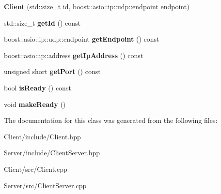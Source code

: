 \begin{DoxyCompactItemize}
\item 
{\bfseries Client} (std\+::size\+\_\+t id, boost\+::asio\+::ip\+::udp\+::endpoint endpoint)\hypertarget{class_client_afc03ac8dfe9f5e626519138fe98795ef}{}\label{class_client_afc03ac8dfe9f5e626519138fe98795ef}

\item 
std\+::size\+\_\+t {\bfseries get\+Id} () const \hypertarget{class_client_aa9043ebd06e78d54895e51ba79f8604a}{}\label{class_client_aa9043ebd06e78d54895e51ba79f8604a}

\item 
boost\+::asio\+::ip\+::udp\+::endpoint {\bfseries get\+Endpoint} () const \hypertarget{class_client_a0bef454cad4e4fc2cb2ad843d3d3c9a8}{}\label{class_client_a0bef454cad4e4fc2cb2ad843d3d3c9a8}

\item 
boost\+::asio\+::ip\+::address {\bfseries get\+Ip\+Address} () const \hypertarget{class_client_a225856505b4297e753321bdc0476bcb2}{}\label{class_client_a225856505b4297e753321bdc0476bcb2}

\item 
unsigned short {\bfseries get\+Port} () const \hypertarget{class_client_afb9dbc507259b98e688ea229270dc793}{}\label{class_client_afb9dbc507259b98e688ea229270dc793}

\item 
bool {\bfseries is\+Ready} () const \hypertarget{class_client_abc9fb145c0b796fa007120261a42cd2a}{}\label{class_client_abc9fb145c0b796fa007120261a42cd2a}

\item 
void {\bfseries make\+Ready} ()\hypertarget{class_client_a7fb429a024015a8be302b5283f41f045}{}\label{class_client_a7fb429a024015a8be302b5283f41f045}

\end{DoxyCompactItemize}


The documentation for this class was generated from the following files\+:\begin{DoxyCompactItemize}
\item 
Client/include/Client.\+hpp\item 
Server/include/Client\+Server.\+hpp\item 
Client/src/Client.\+cpp\item 
Server/src/Client\+Server.\+cpp\end{DoxyCompactItemize}
